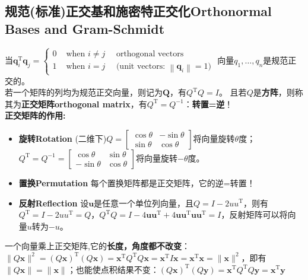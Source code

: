     \subsection{规范(标准)正交基和施密特正交化Orthonormal Bases and Gram-Schmidt}
    当$\boldsymbol{q}_{i}^{\mathrm{T}} \boldsymbol{q}_{j}=\left\{\begin{array}{ll}{0} & {\text { when } i \neq j \quad \text { orthogonal vectors }} \\ {1} & {\text { when } i=j \quad \text { (unit vectors: }\left\|\boldsymbol{q}_{i}\right\|=1 )}\end{array}\right.$
    \quad 向量$q_{1}, \dots, q_{n}$是规范正交的。\\
    若一个矩阵的列均为规范正交向量，则记为$\bm{Q}$，有$Q^{\mathrm{T}} Q=I$。 且若$Q$是\textbf{方阵}，则称其为\textbf{正交矩阵orthogonal matrix}，有$Q^{\mathrm{T}}=Q^{-1}$：\textbf{转置=逆}！
    \\
    \textbf{正交矩阵的作用:}
    \begin{itemize}
        \item \textbf{旋转Rotation} \quad (二维下)$Q=\left[\begin{array}{rr}{\cos \theta} & {-\sin \theta} \\ {\sin \theta} & {\cos \theta}\end{array}\right]$将向量旋转$\theta$度； \quad $Q^{\mathrm{T}}=Q^{-1}=\left[\begin{array}{rr}{\cos \theta} & {\sin \theta} \\ {-\sin \theta} & {\cos \theta}\end{array}\right]$将向量旋转$-\theta$度。
        \item \textbf{置换Permutation} \quad 每个置换矩阵都是正交矩阵，它的逆=转置！
        \item \textbf{反射Reflection} \quad 设$\bm{u}$是任意一个单位列向量，且$Q=I-2 u u^{\mathrm{T}}$，则有$Q^{\mathrm{T}}=I-2 u u^{\mathrm{T}}=Q$，$Q^{\mathrm{T}} Q=I-4 \boldsymbol{u u}^{\mathrm{T}}+4 \boldsymbol{u} \boldsymbol{u}^{\mathrm{T}} \boldsymbol{u} \boldsymbol{u}^{\mathrm{T}}=I$，反射矩阵可以将向量$u$转为$-u$。
    \end{itemize}
    一个向量乘上正交矩阵,它的\textbf{长度，角度都不改变}：$\|Q \boldsymbol{x}\|^{2}=(Q \boldsymbol{x})^{\mathrm{T}}(Q \boldsymbol{x})=\boldsymbol{x}^{\mathrm{T}} Q^{\mathrm{T}} Q \boldsymbol{x}=\boldsymbol{x}^{\mathrm{T}} I \boldsymbol{x}=\boldsymbol{x}^{\mathrm{T}} \boldsymbol{x}=\|\boldsymbol{x}\|^{2}$，即有$\|Q \boldsymbol{x}\|=\|\boldsymbol{x}\|$；也能使点积结果不变：$(Q \boldsymbol{x})^{\mathrm{T}}(Q \boldsymbol{y})=\boldsymbol{x}^{\mathrm{T}} Q^{\mathrm{T}} Q \boldsymbol{y}=\boldsymbol{x}^{\mathrm{T}} \boldsymbol{y}$
